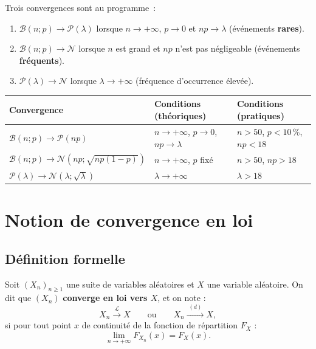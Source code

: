 \documentclass[11pt,a4paper]{article}
\begin{document}
Trois convergences sont au programme~:
\begin{enumerate}
  \item $\mathcal{B}(n;p) \to \mathcal{P}(\lambda)$ \quad lorsque $n\to+\infty$, $p\to 0$ et $np\to\lambda$ (\'ev\'enements \textbf{rares}).
  \item $\mathcal{B}(n;p) \to \mathcal{N}$ \quad lorsque $n$ est grand et $np$ n'est pas n\'egligeable (\'ev\'enements \textbf{fr\'equents}).
  \item $\mathcal{P}(\lambda) \to \mathcal{N}$ \quad lorsque $\lambda\to+\infty$ (fr\'equence d'occurrence \'elev\'ee).
\end{enumerate}

\begin{thmbox}
\renewcommand{\arraystretch}{1.8}
\begin{tabularx}{\linewidth}{lXl}
\toprule
\textbf{Convergence} & \textbf{Conditions (th\'eoriques)} & \textbf{Conditions (pratiques)} \\
\midrule
$\mathcal{B}(n;p) \to \mathcal{P}(np)$ &
  $n\to+\infty$, $p\to 0$, $np\to\lambda$ &
  $n > 50$,\; $p < 10\,\%$,\; $np < 18$ \\
$\mathcal{B}(n;p) \to \mathcal{N}\!\left(np;\sqrt{np(1-p)}\right)$ &
  $n\to+\infty$, $p$ fix\'e &
  $n > 50$,\; $np > 18$ \\
$\mathcal{P}(\lambda) \to \mathcal{N}\!\left(\lambda;\sqrt{\lambda}\right)$ &
  $\lambda\to+\infty$ &
  $\lambda > 18$ \\
\bottomrule
\end{tabularx}
\end{thmbox}

\section{Notion de convergence en loi}

\subsection{D\'efinition formelle}

\begin{defbox}
Soit $(X_n)_{n\geq 1}$ une suite de variables al\'eatoires et $X$ une variable al\'eatoire. On dit que $(X_n)$ \textbf{converge en loi vers $X$}, et on note :
$$X_n \xrightarrow{\;\mathcal{L}\;} X \qquad\text{ou}\qquad X_n \xrightarrow{\;(d)\;} X,$$
si pour tout point $x$ de continuit\'e de la fonction de r\'epartition $F_X$ :
$$\lim_{n\to+\infty} F_{X_n}(x) = F_X(x).$$
\end{defbox}
\end{document}
